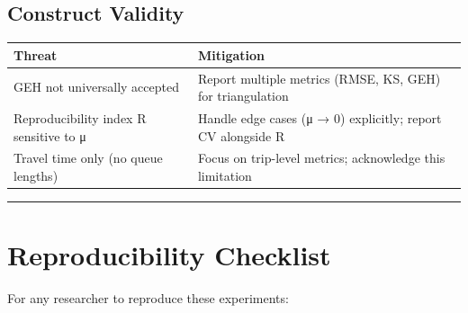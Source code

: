 \subsection{Construct Validity}\label{463-construct-validity}

\begin{longtable}[]{@{}ll@{}}
\toprule\noalign{}
Threat & Mitigation \\
\midrule\noalign{}
\endhead
\bottomrule\noalign{}
\endlastfoot
GEH not universally accepted & Report multiple metrics (RMSE, KS, GEH)
for triangulation \\
Reproducibility index R sensitive to μ & Handle edge cases (μ → 0)
explicitly; report CV alongside R \\
Travel time only (no queue lengths) & Focus on trip-level metrics;
acknowledge this limitation \\
\end{longtable}

\begin{center}\rule{0.5\linewidth}{0.5pt}\end{center}

\section{Reproducibility
Checklist}\label{47-reproducibility-checklist}

For any researcher to reproduce these experiments:

